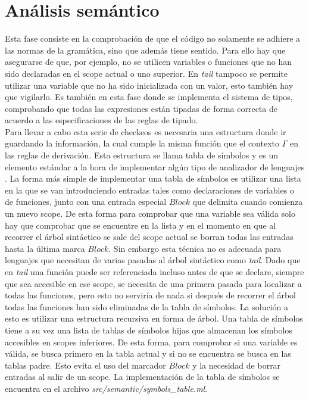 \section{Análisis semántico}

Esta fase consiste en la comprobación de que el código no solamente se adhiere a las normas de la gramática, sino que además tiene sentido. Para ello hay que asegurarse de que, por ejemplo, no se utilicen variables o funciones que no han sido declaradas en el scope actual o uno superior. En \textit{tail} tampoco se permite utilizar una variable que no ha sido inicializada con un valor, esto también hay que vigilarlo. Es también en esta fase donde se implementa el sistema de tipos, comprobando que todas las expresiones están tipadas de forma correcta de acuerdo a las especificaciones de las reglas de tipado.\\

Para llevar a cabo esta serie de checkeos es necesaria una estructura donde ir guardando la información, la cual cumple la misma función que el contexto $\Gamma$ en las reglas de derivación. Esta estructura se llama tabla de símbolos y es un elemento estándar a la hora de implementar algún tipo de analizador de lenguajes \cite{dragoonBook}. La forma más simple de implementar una tabla de símbolos es utilizar una lista en la que se van introduciendo entradas tales como declaraciones de variables o de funciones, junto con una entrada especial $Block$ que delimita cuando comienza un nuevo scope. De esta forma para comprobar que una variable sea válida solo hay que comprobar que se encuentre en la lista y en el momento en que al recorrer el árbol sintáctico se sale del scope actual se borran todas las entradas hasta la última marca $Block$. Sin embargo esta técnica no es adecuada para lenguajes que necesitan de varias pasadas al árbol sintáctico como \textit{tail}. Dado que en \textit{tail} una función puede ser referenciada incluso antes de que se declare, siempre que sea accesible en ese scope, se necesita de una primera pasada para localizar a todas las funciones, pero esto no serviría de nada si después de recorrer el árbol todas las funciones han sido eliminadas de la tabla de símbolos. La solución a esto es utilizar una estructura recursiva en forma de árbol. Una tabla de símbolos tiene a su vez una lista de tablas de símbolos hijas que almacenan los símbolos accesibles en scopes inferiores. De esta forma, para comprobar si una variable es válida, se busca primero en la tabla actual y si no se encuentra se busca en las tablas padre. Esto evita el uso del marcador $Block$ y la necesidad de borrar entradas al salir de un scope. La implementación de la tabla de símbolos se encuentra en el archivo \textit{src/semantic/symbols\_table.ml}.\\

